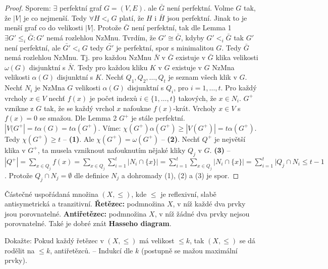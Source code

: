 \begin{proof}
	Sporem: $\exists$ perfektní graf $G = (V,E)$. ale $\bar{G}$ není perfektní. Volme $G$ tak, že $|V|$ je co nejmenší. Tedy $\forall H <_{i} G$ platí, že $H$ i $\bar{H}$ jsou perfektní. Jinak to je menší graf co do velikosti $|V|$. Protože $\bar{G}$ není perfektní, tak dle Lemma 1 $\exists G' \leq_{i} \bar{G}: G'$ nemá rozlehlou NzMnu. Tvrdím, že $G' \cong \bar{G}$, kdyby $G' <_{i} \bar{G}$ tak $G'$ není perfektní, ale $\bar{G'} <_{i} G$ tedy $\bar{G'}$ je perfektní, spor s minimalitou $G$. Tedy $\bar{G}$ nemá rozlehlou NzMnu. Tj. pro každou NzMnu $\bar{N}$ v $\bar{G}$ existuje v $\bar{G}$ klika velikosti $\omega(G)$ disjunktní s $\bar{N}$. Tedy pro každou kliku $K$ v $G$ existuje v $G$ NzMna velikosti $\alpha(G)$ disjunktní s $K$. Nechť $Q_{1},Q_{2}, \dots, Q_{t}$ je seznam všech klik v $G$. Nechť $N_{i}$ je NzMna $G$ velikosti $\alpha(G)$ disjunktní s $Q_{i}$, pro $i = 1,\dots, t$. Pro každý vrcholy $x \in V$ nechť $f(x)$ je počet indexů $i \in \{1, \dots, t\}$ takových, že $x \in N_{i}$. $G^{+}$ vznikne z $G$ tak, že se každý vrchol $x$ nafoukne $f(x)$-krát. Vrcholy $x \in V$ s $f(x) = 0$ se smažou. Dle Lemma 2 $G^{+}$ je stále perfektní. $|V(G^{+}| = t \alpha(G) = t \alpha(G^{+})$. Víme: $\chi(G^{+}) \alpha(G^{+}) \geq |V(G^{+})| = t \alpha(G^{+})$. Tedy $\chi(G^{+}) \geq t$ -- \textbf{(1)}. Ale $\chi(G^{+}) = \omega(G^{+})$ -- \textbf{(2)}. Nechť $Q^{+}$ je největší klika v $G^{+}$, ta musela vzniknout nafouknutím nějaké kliky $Q_{j}$ v $G$. \textbf{(3)} -- $|Q^{+}| = \sum_{x \in Q_{j}} f(x) = \sum_{x \in Q_{j}} \sum_{i=1}^{t}|N_{i} \cap \{x\}| = \sum_{i=1}^{t}\sum_{x \in Q_{j}} |N_{i} \cap \{x\}| = \sum_{i=1}^{t} |Q_{j} \cap N_{i} \leq t -1$. Protože $Q_{j} \cap N_{j} = \emptyset$ dle definice $N_{j}$ a dohromady (1), (2) a (3) je spor.
\end{proof}

\begin{definice}[Připomenutí]
	Částečné uspořádaná množina $(X, \leq)$, kde $\leq$ je reflexivní, slabě antisymetrická a tranzitivní. \textbf{Řetězec:} podmnožina $X$, v níž každé dva prvky jsou porovnatelné. \textbf{Antiřetězec:} podmnožina $X$, v níž žádné dva prvky nejsou porovnatelné. Také je dobré znát \textbf{Hasseho diagram}.
\end{definice}

\begin{cvic}
	Dokažte: Pokud každý řetězec v $(X, \leq)$ má velikost $\leq k$, tak $(X,\leq)$ se dá rodělit na $\leq k$, antiřetězců. -- Indukcí dle $k$ (postupně se mažou maximální prvky).

\end{cvic}

